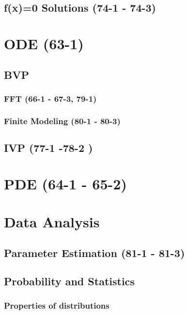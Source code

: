 \documentclass{mitqualif}
\begin{document}
\subsection{f(x)=0 Solutions (74-1 - 74-3)}
\section{ODE (63-1)}
\subsection{BVP}
\subsubsection{FFT (66-1 - 67-3, 79-1)}
\subsubsection{Finite Modeling (80-1 - 80-3)}
\subsection{IVP (77-1 -78-2 )}
\section{PDE (64-1 - 65-2)}
\section{Data Analysis}
\subsection{Parameter Estimation (81-1 - 81-3)}
\subsection{Probability and Statistics}
\subsubsection{Properties of distributions}
 


\newpage

\newpage
\printindex
\newpage
%
\end{document}
